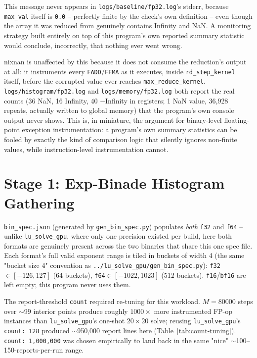 \documentclass[11pt,a4paper]{article}
\begin{document}
\noindent This message never appears in \texttt{logs/baseline/fp32.log}'s
stderr, because \texttt{max\_val} itself is \texttt{0.0} -- perfectly
finite by the check's own definition -- even though the array it was
reduced from genuinely contains Infinity and NaN. A monitoring strategy
built entirely on top of this program's own reported summary statistic
would conclude, incorrectly, that nothing ever went wrong.

nixnan is unaffected by this because it does not consume the reduction's
output at all: it instruments every \texttt{FADD}/\texttt{FFMA} as it
executes, inside \texttt{rd\_step\_kernel} itself, before the corrupted
value ever reaches \texttt{max\_reduce\_kernel}. \texttt{logs/histogram/fp32.log}
and \texttt{logs/memory/fp32.log} both report the real counts (36 NaN, 16
Infinity, 40 $-$Infinity in registers; 1 NaN value, 36{,}928 repeats,
actually written to global memory) that the program's own console output
never shows. This is, in miniature, the argument for binary-level
floating-point exception instrumentation: a program's own summary
statistics can be fooled by exactly the kind of comparison logic that
silently ignores non-finite values, while instruction-level instrumentation
cannot.

\section{Stage 1: Exp-Binade Histogram Gathering}
\label{sec:histogram}

\texttt{bin\_spec.json} (generated by \texttt{gen\_bin\_spec.py}) populates
\emph{both} \texttt{f32} and \texttt{f64} -- unlike \texttt{lu\_solve\_gpu},
where only one precision existed per build, here both formats are
genuinely present across the two binaries that share this one spec file.
Each format's full valid exponent range is tiled in buckets of width 4
(the same "bucket size 4" convention as
\texttt{../lu\_solve\_gpu/gen\_bin\_spec.py}): \texttt{f32}
$\in[-126,127]$ (64 buckets), \texttt{f64}$\in[-1022,1023]$ (512 buckets).
\texttt{f16}/\texttt{bf16} are left empty; this program never uses them.

The report-threshold \texttt{count} required re-tuning for this workload.
$M=80000$ steps over $\sim$99 interior points produce roughly $1000\times$
more instrumented FP-op instances than \texttt{lu\_solve\_gpu}'s one-shot
$20\times20$ solve; reusing \texttt{lu\_solve\_gpu}'s \texttt{count: 128}
produced $\sim$950,000 report lines here (Table~\ref{tab:count-tuning}).
\texttt{count: 1{,}000{,}000} was chosen empirically to land back in the
same "nice" $\sim$100--150-reports-per-run range.
\end{document}
